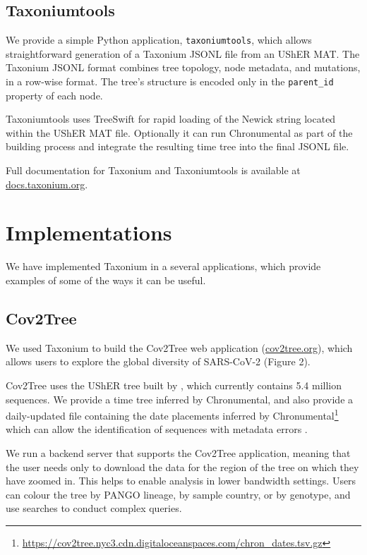 \subsection*{Taxoniumtools}

We provide a simple Python application, \texttt{taxoniumtools}, which allows straightforward generation of a Taxonium JSONL file from an UShER MAT. The Taxonium JSONL format combines tree topology, node metadata, and mutations, in a row-wise format. The tree's structure is encoded only in the \texttt{parent\_id} property of each node.

Taxoniumtools uses TreeSwift \citep{moshiri2020treeswift} for rapid loading of the Newick string located within the UShER MAT file. Optionally it can run Chronumental \citep{chronumental} as part of the building process and integrate the resulting time tree into the final JSONL file.

Full documentation for Taxonium and Taxoniumtools is available at \href{http://docs.taxonium.org}{docs.taxonium.org}.

\section*{Implementations}

We have implemented Taxonium in a several applications, which provide examples of some of the ways it can be useful.

\subsection*{Cov2Tree}

We used Taxonium to build the Cov2Tree web application (\href{http://cov2tree.org}{cov2tree.org}), which allows users to explore the global diversity of SARS-CoV-2 (Figure 2). 

Cov2Tree uses the UShER tree built by \cite{McBroome2021}, which currently contains 5.4 million sequences. We provide a time tree inferred by Chronumental, and also provide a daily-updated file containing the date placements inferred by Chronumental\footnote{\url{https://cov2tree.nyc3.cdn.digitaloceanspaces.com/chron_dates.tsv.gz}} which can allow the identification of sequences with metadata errors \citep{chronumental}.

We run a backend server that supports the Cov2Tree application, meaning that the user needs only to download the data for the region of the tree on which they have zoomed in. This helps to enable analysis in lower bandwidth settings. Users can colour the tree by PANGO lineage, by sample country, or by genotype, and use searches to conduct complex queries.

